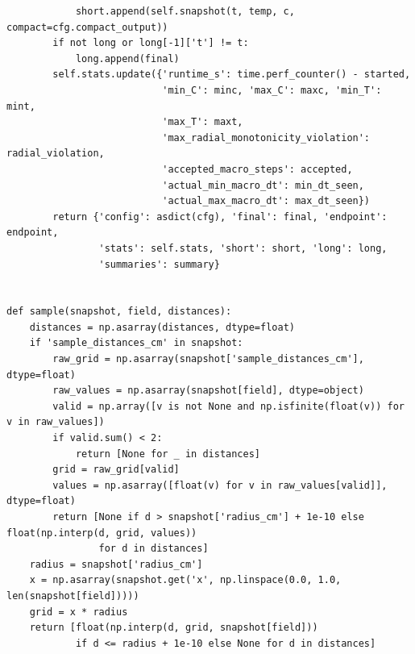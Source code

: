 \begin{verbatim}
            short.append(self.snapshot(t, temp, c, compact=cfg.compact_output))
        if not long or long[-1]['t'] != t:
            long.append(final)
        self.stats.update({'runtime_s': time.perf_counter() - started,
                           'min_C': minc, 'max_C': maxc, 'min_T': mint,
                           'max_T': maxt,
                           'max_radial_monotonicity_violation': radial_violation,
                           'accepted_macro_steps': accepted,
                           'actual_min_macro_dt': min_dt_seen,
                           'actual_max_macro_dt': max_dt_seen})
        return {'config': asdict(cfg), 'final': final, 'endpoint': endpoint,
                'stats': self.stats, 'short': short, 'long': long,
                'summaries': summary}


def sample(snapshot, field, distances):
    distances = np.asarray(distances, dtype=float)
    if 'sample_distances_cm' in snapshot:
        raw_grid = np.asarray(snapshot['sample_distances_cm'], dtype=float)
        raw_values = np.asarray(snapshot[field], dtype=object)
        valid = np.array([v is not None and np.isfinite(float(v)) for v in raw_values])
        if valid.sum() < 2:
            return [None for _ in distances]
        grid = raw_grid[valid]
        values = np.asarray([float(v) for v in raw_values[valid]], dtype=float)
        return [None if d > snapshot['radius_cm'] + 1e-10 else float(np.interp(d, grid, values))
                for d in distances]
    radius = snapshot['radius_cm']
    x = np.asarray(snapshot.get('x', np.linspace(0.0, 1.0, len(snapshot[field]))))
    grid = x * radius
    return [float(np.interp(d, grid, snapshot[field]))
            if d <= radius + 1e-10 else None for d in distances]

\end{verbatim}

